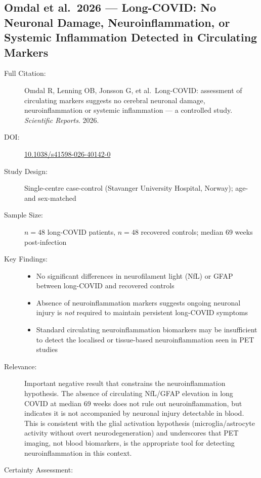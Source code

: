 \subsection{Omdal et al.\ 2026 --- Long-COVID: No Neuronal Damage, Neuroinflammation, or Systemic Inflammation Detected in Circulating Markers}

\begin{description}
    \item[Full Citation:] Omdal R, Lenning OB, Jonsson G, et al.\ Long-COVID: assessment of circulating markers suggests no cerebral neuronal damage, neuroinflammation or systemic inflammation --- a controlled study. \textit{Scientific Reports}. 2026. \cite{Omdal2026LongCovidNeuroinflammation}
    \item[DOI:] \href{https://doi.org/10.1038/s41598-026-40142-0}{10.1038/s41598-026-40142-0}
    \item[Study Design:] Single-centre case-control (Stavanger University Hospital, Norway); age- and sex-matched
    \item[Sample Size:] $n=48$ long-COVID patients, $n=48$ recovered controls; median 69 weeks post-infection
    \item[Key Findings:]
    \begin{itemize}
        \item No significant differences in neurofilament light (NfL) or GFAP between long-COVID and recovered controls
        \item Absence of neuroinflammation markers suggests ongoing neuronal injury is \emph{not} required to maintain persistent long-COVID symptoms
        \item Standard circulating neuroinflammation biomarkers may be insufficient to detect the localised or tissue-based neuroinflammation seen in PET studies
    \end{itemize}
    \item[Relevance:] Important negative result that constrains the neuroinflammation hypothesis. The absence of circulating NfL/GFAP elevation in long COVID at median 69 weeks does not rule out neuroinflammation, but indicates it is not accompanied by neuronal injury detectable in blood. This is consistent with the glial activation hypothesis (microglia/astrocyte activity without overt neurodegeneration) and underscores that PET imaging, not blood biomarkers, is the appropriate tool for detecting neuroinflammation in this context.
    \item[Certainty Assessment:]
    \begin{itemize}

\end{itemize}
\end{description}

